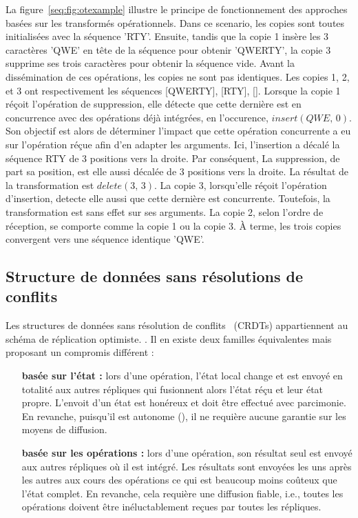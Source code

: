 La figure~\ref{seq:fig:otexample} illustre le principe de fonctionnement des
approches basées sur les transformés opérationnels. Dans ce scenario, les copies
sont toutes initialisées avec la séquence 'RTY'. Ensuite, tandis que la copie 1
insère les 3 caractères 'QWE' en tête de la séquence pour obtenir 'QWERTY', la
copie 3 supprime ses trois caractères pour obtenir la séquence vide. Avant la
dissémination de ces opérations, les copies ne sont pas identiques. Les copies
1, 2, et 3 ont respectivement les séquences [QWERTY], [RTY], []. Lorsque la
copie 1 réçoit l'opération de suppression, elle détecte que cette dernière est
en concurrence avec des opérations déjà intégrées, en l'occurence,
$insert(QWE,\,0)$. Son objectif est alors de déterminer l'impact que cette
opération concurrente a eu sur l'opération réçue afin d'en adapter les
arguments. Ici, l'insertion a décalé la séquence RTY de 3 positions vers la
droite. Par conséquent, La suppression, de part sa position, est elle aussi
décalée de 3 positions vers la droite. La résultat de la transformation est
$delete(3,\,3)$.  La copie 3, lorsqu'elle réçoit l'opération d'insertion,
detecte elle aussi que cette dernière est concurrente. Toutefois, la
transformation est sans effet sur ses arguments. La copie 2, selon l'ordre de
réception, se comporte comme la copie 1 ou la copie 3. À terme, les trois copies
convergent vers une séquence identique 'QWE'.


\subsection{Structure de données sans résolutions de conflits}

Les structures de données sans résolution de
conflits~\cite{shapiro2011comprehensive} (CRDTs) appartiennent au schéma de
réplication optimiste. .  Il en existe deux
familles équivalentes mais proposant un compromis différent :
\begin{itemize}
\item [\textbf{basée sur l'état :}] lors d'une opération, l'état local change et
  est envoyé en totalité aux autres répliques qui fusionnent alors l'état réçu
  et leur état propre. L'envoit d'un état est honéreux et doit être effectué
  avec parcimonie. En revanche, puisqu'il est autonome
  (), il ne requière aucune garantie sur les moyens
  de diffusion.
\item [\textbf{basée sur les opérations :}] lors d'une opération, son résultat
  seul est envoyé aux autres répliques où il est intégré. Les résultats sont
  envoyées les uns après les autres aux cours des opérations ce qui est beaucoup
  moins coûteux que l'état complet. En revanche, cela requière une diffusion
  fiable, i.e., toutes les opérations doivent être inéluctablement reçues par
  toutes les répliques.
\end{itemize}

